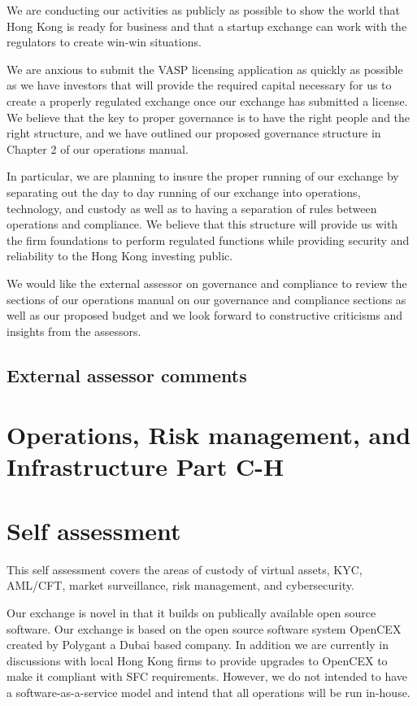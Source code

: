 \documentclass[]{report}
\begin{document}
We are conducting our activities as publicly as possible to show the
world that Hong Kong is ready for business and that a startup exchange
can work with the regulators to create win-win situations.

We are anxious to submit the VASP licensing application as quickly as
possible as we have investors that will provide the required capital
necessary for us to create a properly regulated exchange once our
exchange has submitted a license.  We believe that the key to proper
governance is to have the right people and the right structure, and we
have outlined our proposed governance structure in Chapter 2 of our
operations manual.

In particular, we are planning to insure the proper running of our
exchange by separating out the day to day running of our exchange into
operations, technology, and custody as well as to having a separation
of rules between operations and compliance.  We believe that this
structure will provide us with the firm foundations to perform
regulated functions while providing security and reliability to the
Hong Kong investing public.

We would like the external assessor on governance and compliance to
review the sections of our operations manual on our governance and
compliance sections as well as our proposed budget and we look forward
to constructive criticisms and insights from the assessors.

\subsection{External assessor comments}

\section{Operations, Risk management, and Infrastructure Part C-H}

\section{Self assessment}

This self assessment covers the areas of custody of virtual assets,
KYC, AML/CFT, market surveillance, risk management, and cybersecurity.

Our exchange is novel in that it builds on publically available open
source software.  Our exchange is based on the open source software
system OpenCEX created by Polygant a Dubai based company.  In addition
we are currently in discussions with local Hong Kong firms to provide
upgrades to OpenCEX to make it compliant with SFC requirements.
However, we do not intended to have a software-as-a-service model and
intend that all operations will be run in-house.
\end{document}
